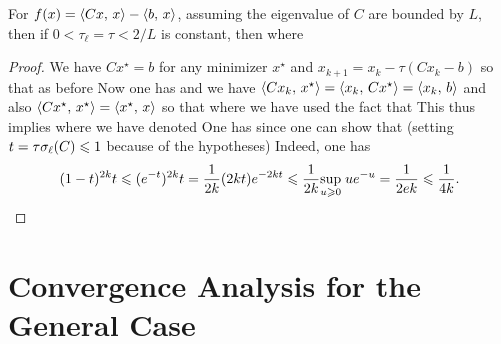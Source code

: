 \begin{prop}\label{prop-graddesc-quad}
	For $f(x)=\langle Cx,\,x\rangle-\langle b,\,x\rangle$, assuming the eigenvalue of $C$ are bounded by $L$, then if $0<\tau_\ell=\tau < 2/L$ is constant, then
	where 
\end{prop}
\begin{proof}	
	We have $C x^\star=b$ for any minimizer $x^\star$
	and $x_{k+1}=x_k-\tau (C x_k-b)$ so that as before
	Now one has
	and we have $\langle Cx_k,\,x^\star\rangle = \langle x_k,\,Cx^\star\rangle = \langle x_k,\,b\rangle$
	and also $\langle Cx^\star,\,x^\star\rangle = \langle x^\star,\,x\rangle$ so that
	where we have used the fact that
	This thus implies 
	where we have denoted
	One has 
	since one can show that (setting $t = \tau \sigma_\ell(C) \leqslant 1$ because of the hypotheses)
	Indeed, one has
	\begin{align*}
		(1-t)^{2k} t \leqslant (e^{-t})^{2k}t
		= \frac{1}{2k} (2kt) e^{-2k t}
		\leqslant \frac{1}{2k} \underset{u \geqslant 0}{\sup}\; u e^{-u}
		= \frac{1}{2e k} \leqslant \frac{1}{4k}.
	\end{align*}
\end{proof}	
	


\section{Convergence Analysis for the General Case}


